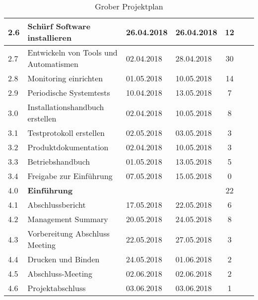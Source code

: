 \begin{table}[H]
\begin{tabular}{|p{0.7cm}p{6.8cm}p{2cm}p{2cm}|c|c|c|}
2.6 & Schürf Software installieren & 26.04.2018 & 26.04.2018 & 12  & & \\\hline
2.7 & Entwickeln von Tools und Automatismen & 02.04.2018 & 28.04.2018 & 30 & &  \\\hline
2.8 & Monitoring einrichten & 01.05.2018 & 10.05.2018 & 14  & & \\\hline
2.9 & Periodische Systemtests & 10.04.2018 & 13.05.2018 & 7  & & \\\hline
3.0 & Installationshandbuch erstellen & 02.04.2018 & 10.05.2018 & 8 & &   \\\hline
3.1 & Testprotokoll erstellen & 02.05.2018 & 03.05.2018 & 3  & & \\\hline
3.2 & Produktdokumentation & 02.04.2018 & 10.05.2018 & 3  & & \\\hline
3.3 & Betriebshandbuch & 01.05.2018 & 13.05.2018 & 5  & & \\\hline
3.4 & Freigabe zur Einführung & 07.05.2018 & 15.05.2018 & 0 & &  \\\hline
\rowcolor{subheading} 4.0 & \textbf{Einführung} & & & 22 & & \\\hline
4.1 & Abschlussbericht & 17.05.2018 & 22.05.2018 & 6  & & \\\hline
4.2 & Management Summary & 20.05.2018 & 24.05.2018 & 8  & & \\\hline
4.3 & Vorbereitung  Abschluss Meeting & 22.05.2018 & 27.05.2018 & 3 & &  \\\hline
4.4 & Drucken und Binden & 24.05.2018 & 01.06.2018 & 2 & &  \\\hline
4.5 & Abschluss-Meeting & 02.06.2018 & 02.06.2018 & 2 & &  \\\hline
4.6 & Projektabschluss & 03.06.2018 & 03.06.2018 & 1 & &  \\\hline
\end{tabular}
\caption{Grober Projektplan}
\end{table}

